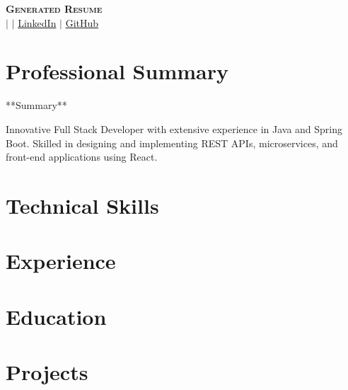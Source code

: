 \documentclass[letterpaper,11pt]{article}
\newcommand{\resumeSubHeadingListStart}{\begin{itemize}[leftmargin=0.15in, label={}]}
\newcommand{\resumeSubHeadingListEnd}{\end{itemize}}
\begin{document}
\begin{center}
    \textbf{\Huge \scshape Generated Resume} \\ \vspace{1pt}
    \small  $|$ \href{mailto:}{} $|$ 
    \href{}{LinkedIn} $|$
    \href{}{GitHub}
\end{center}

\section{Professional Summary}
\small{**Summary**

Innovative Full Stack Developer with extensive experience in Java and Spring Boot. Skilled in designing and implementing REST APIs, microservices, and front-end applications using React. }

\section{Technical Skills}
 \begin{itemize}[leftmargin=0.15in, label={}]
    \small{\item{
     
    }}
 \end{itemize}

\section{Experience}
  \resumeSubHeadingListStart
    
  \resumeSubHeadingListEnd

\section{Education}
  \resumeSubHeadingListStart
    
  \resumeSubHeadingListEnd

\section{Projects}
    \resumeSubHeadingListStart
      
    \resumeSubHeadingListEnd

\end{document}
